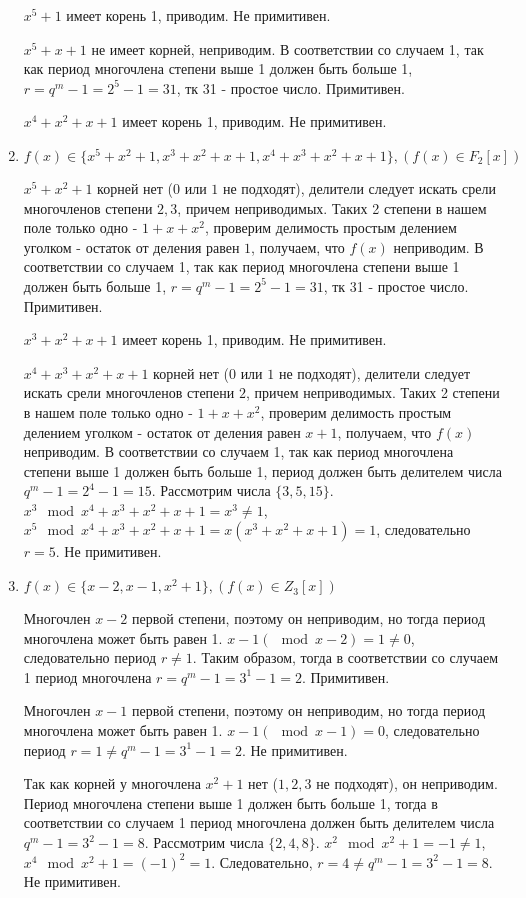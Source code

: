 \documentclass[12pt]{extarticle}
\begin{document}
\begin{enumerate}
    $x^5+1$ имеет корень 1, приводим. Не примитивен.
    
    $x^5+x+1$ не имеет корней, неприводим. В соответствии со случаем 1, так как период многочлена степени выше 1 должен быть больше 1, $r = q^m -1 = 2^5 - 1 = 31$, тк 31 - простое число. Примитивен.
    
    $x^4+x^2+x+1$ имеет корень 1, приводим. Не примитивен.

    \item $f(x)\in\{x^5+x^2+1, x^3+x^2+x+1, x^4+x^3+x^2+x+1\}, (f(x)\in F_2[x])$
    
    $x^5+x^2+1$ корней нет ($0$ или $1$ не подходят), делители следует искать срели многочленов степени $2,3$, причем неприводимых. Таких 2 степени в нашем поле только одно - $1 + x + x^2$, проверим делимость простым делением уголком - остаток от деления равен $1$, получаем, что $f(x)$ неприводим. В соответствии со случаем 1, так как период многочлена степени выше 1 должен быть больше 1, $r = q^m -1 = 2^5 - 1 = 31$, тк 31 - простое число. Примитивен.

    $x^3+x^2+x+1$ имеет корень 1, приводим. Не примитивен.
    
    $ x^4+x^3+x^2+x+1 $ корней нет ($0$ или $1$ не подходят), делители следует искать срели многочленов степени $2$, причем неприводимых. Таких 2 степени в нашем поле только одно - $1 + x + x^2$, проверим делимость простым делением уголком - остаток от деления равен $x+1$, получаем, что $f(x)$ неприводим. В соответствии со случаем 1, так как период многочлена степени выше 1 должен быть больше 1, период должен быть делителем числа $ q^m -1 = 2^4 - 1 = 15$. Рассмотрим числа $\{3, 5, 15\}$. $x^3 \mod x^4+x^3+x^2+x+1 = x^3 \neq 1$, $x^5 \mod x^4+x^3+x^2+x+1 = x(x^3+x^2+x+1) = 1$, следовательно $r= 5$. Не примитивен.
    
    \item $f(x)\in\{x-2, x-1, x^2+1\}, (f(x)\in Z_3[x])$
    
    Многочлен $x-2$ первой степени, поэтому он неприводим, но тогда период многочлена может быть равен 1. $x - 1 (\mod{x - 2}) = 1 \neq 0$, следовательно период $r \neq 1$. Таким образом, тогда в соответствии со случаем 1 период многочлена $r = q^m - 1 = 3^1 -1 = 2$. Примитивен.
    
    Многочлен $x-1$ первой степени, поэтому он неприводим, но тогда период многочлена может быть равен 1. $x - 1 (\mod{x - 1}) = 0$, следовательно период $r = 1 \neq q^m - 1 = 3^1 -1 = 2$. Не примитивен.
    
    Так как корней у многочлена $x^2+1$ нет ($1,2,3$ не подходят), он неприводим. Период многочлена степени выше 1 должен быть больше 1, тогда в соответствии со случаем 1 период многочлена должен быть делителем числа $q^m -1 = 3^2 -1 = 8$. Рассмотрим числа $\{2, 4, 8\}$. $x^2 \mod x^2 + 1 = -1 \neq 1$,  $x^4 \mod x^2 + 1 = (-1)^2 = 1$. Следовательно, $r=4 \neq q^m -1 = 3^2 -1 = 8$. Не примитивен.


\end{enumerate}
\end{document}
